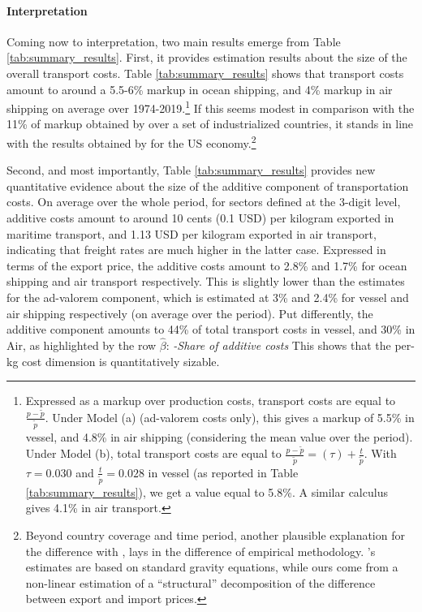 \documentclass[a4paper,11pt]{article}
\begin{document}



\paragraph{Interpretation} Coming now to interpretation, two main results emerge from Table \ref{tab:summary_results}.
First, it provides estimation results about the size of the overall transport costs.
Table \ref{tab:summary_results} shows that transport costs amount to around a 5.5-6\% markup in ocean shipping, and 4\% markup in air shipping on average over 1974-2019.\footnote{Expressed as a markup over production costs, transport costs are equal to $\frac{p-\widetilde{p}}{\widetilde{p}}$.
Under Model (a) (ad-valorem costs only), this gives a markup of 5.5\% in vessel, and 4.8\% in air shipping (considering the mean value over the period).
Under Model (b), total transport costs are equal to $\frac{p-\widetilde{p}}{\widetilde{p}} = (\tau) + \frac{t}{\widetilde{p}}$.
With $\tau= 0.030$ and $\frac{t}{\widetilde{p}}= 0.028$ in vessel (as reported in Table \ref{tab:summary_results}), we get a value equal to 5.8\%.
A similar calculus gives 4.1\% in air transport.} If this seems modest in comparison with the 11\% of markup obtained by \cite{anderson_wincoop_jel} over a set of industrialized countries, it stands in line with the results obtained by \cite{hummels2007} for the US economy.\footnote{Beyond country coverage and time period, another plausible explanation for the difference with \cite{anderson_wincoop_jel}, lays in the difference of empirical methodology.
\cite{anderson_wincoop_jel}'s estimates are based on standard gravity equations, while ours come from a non-linear estimation of a ``structural'' decomposition of the difference between export and import prices.}

Second, and most importantly, Table \ref{tab:summary_results} provides new quantitative evidence about the size of the additive component of transportation costs.
On average over the whole period, for sectors defined at the 3-digit level, additive costs amount to around 10 cents (0.1 USD) per kilogram exported in maritime transport, and 1.13 USD per kilogram exported in air transport, indicating that freight rates are much higher in the latter case.
Expressed in terms of the export price, the additive costs amount to 2.8\% and 1.7\% for ocean shipping and air transport respectively.
This is slightly lower than the estimates for the ad-valorem component, which is estimated at 3\% and 2.4\% for vessel and air shipping respectively (on average over the period).
Put differently, the additive component amounts to 44\% of total transport costs in vessel, and 30\% in Air, as highlighted by the row $\widehat{\beta}$:  \textit{-Share of additive costs}
This shows that the per-kg cost dimension is quantitatively sizable.
\medskip
\end{document}
